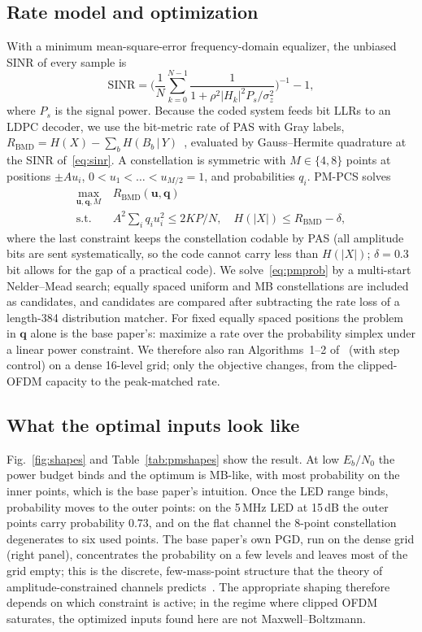 \documentclass[conference]{IEEEtran}
\begin{document}
\subsection{Rate model and optimization}
With a minimum mean-square-error frequency-domain equalizer, the unbiased SINR of every sample is
\begin{equation}
\mathrm{SINR}=\Big(\frac1N\sum_{k=0}^{N-1}\frac{1}{1+\rho^2|H_k|^2P_s/\sigma_z^2}\Big)^{-1}-1,\label{eq:sinr}
\end{equation}
where $P_s$ is the signal power. Because the coded system feeds bit LLRs to an LDPC decoder, we use the bit-metric rate of PAS with Gray labels, $R_{\mathrm{BMD}}=H(X)-\sum_bH(B_b\,|\,Y)$~\cite{bocherer2023}, evaluated by Gauss--Hermite quadrature at the SINR of~\eqref{eq:sinr}. A constellation is symmetric with $M\in\{4,8\}$ points at positions $\pm A u_i$, $0<u_1<\dots<u_{M/2}=1$, and probabilities $q_i$. PM-PCS solves
\begin{equation}
\begin{aligned}
\max_{\mathbf u,\mathbf q,M}\ & R_{\mathrm{BMD}}(\mathbf u,\mathbf q)\\
\text{s.t.}\ & A^2\textstyle\sum_i q_iu_i^2\le 2KP/N,\quad H(|X|)\le R_{\mathrm{BMD}}-\delta,
\end{aligned}\label{eq:pmprob}
\end{equation}
where the last constraint keeps the constellation codable by PAS (all amplitude bits are sent systematically, so the code cannot carry less than $H(|X|)$; $\delta=0.3$\,bit allows for the gap of a practical code). We solve~\eqref{eq:pmprob} by a multi-start Nelder--Mead search; equally spaced uniform and MB constellations are included as candidates, and candidates are compared after subtracting the rate loss of a length-384 distribution matcher. For fixed equally spaced positions the problem in $\mathbf q$ alone is the base paper's: maximize a rate over the probability simplex under a linear power constraint. We therefore also ran Algorithms~1--2 of~\cite{pham2026} (with step control) on a dense 16-level grid; only the objective changes, from the clipped-OFDM capacity to the peak-matched rate.

\subsection{What the optimal inputs look like}
Fig.~\ref{fig:shapes} and Table~\ref{tab:pmshapes} show the result. At low $E_b/N_0$ the power budget binds and the optimum is MB-like, with most probability on the inner points, which is the base paper's intuition. Once the LED range binds, probability moves to the outer points: on the 5\,MHz LED at 15\,dB the outer points carry probability 0.73, and on the flat channel the 8-point constellation degenerates to six used points. The base paper's own PGD, run on the dense grid (right panel), concentrates the probability on a few levels and leaves most of the grid empty; this is the discrete, few-mass-point structure that the theory of amplitude-constrained channels predicts~\cite{dytso2020}. The appropriate shaping therefore depends on which constraint is active; in the regime where clipped OFDM saturates, the optimized inputs found here are not Maxwell--Boltzmann.
\end{document}
